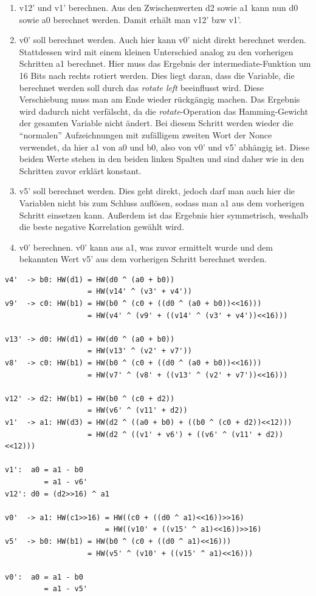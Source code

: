\documentclass[a4paper,ngerman]{scrreprt}
\begin{document}
\begin{enumerate}
    \item v12' und v1' berechnen. Aus den Zwischenwerten d2 sowie a1 kann nun d0
        sowie a0 berechnet werden. Damit erhält man v12' bzw v1'.

    \item v0' soll berechnet werden. Auch hier kann v0' nicht direkt berechnet
        werden. Stattdessen wird mit einem kleinen Unterschied analog zu den
        vorherigen Schritten a1 berechnet. Hier muss das Ergebnis der
        intermediate-Funktion um 16 Bits nach rechts rotiert werden. Dies liegt
        daran, dass die Variable, die berechnet werden soll durch das
        \emph{rotate left} beeinflusst wird. Diese Verschiebung muss man am Ende
        wieder rückgängig machen. Das Ergebnis wird dadurch nicht verfälscht, da
        die \emph{rotate}-Operation das Hamming-Gewicht der gesamten Variable
        nicht ändert. Bei diesem Schritt werden wieder die ``normalen''
        Aufzeichnungen mit zufälligem zweiten Wort der Nonce verwendet, da hier
        a1 von a0 und b0, also von v0' und v5' abhängig ist. Diese beiden Werte
        stehen in den beiden linken Spalten und sind daher wie in den Schritten
        zuvor erklärt konstant.

    \item v5' soll berechnet werden. Dies geht direkt, jedoch darf man auch hier
        die Variablen nicht bis zum Schluss auflösen, sodass man a1 aus dem
        vorherigen Schritt einsetzen kann. Außerdem ist das Ergebnis hier
        symmetrisch, weshalb die beste negative Korrelation gewählt wird.

    \item v0' berechnen. v0' kann aus a1, was zuvor ermittelt wurde und dem
        bekannten Wert v5' aus dem vorherigen Schritt berechnet werden.
\end{enumerate}


\begin{lstlisting}[caption={Modelle für Stromverbrauch}, label=lst:cpa-model-3]
v4'  -> b0: HW(d1) = HW(d0 ^ (a0 + b0))
                   = HW(v14' ^ (v3' + v4'))
v9'  -> c0: HW(b1) = HW(b0 ^ (c0 + ((d0 ^ (a0 + b0))<<16)))
                   = HW(v4' ^ (v9' + ((v14' ^ (v3' + v4'))<<16)))

v13' -> d0: HW(d1) = HW(d0 ^ (a0 + b0))
                   = HW(v13' ^ (v2' + v7'))
v8'  -> c0: HW(b1) = HW(b0 ^ (c0 + ((d0 ^ (a0 + b0))<<16)))
                   = HW(v7' ^ (v8' + ((v13' ^ (v2' + v7'))<<16)))

v12' -> d2: HW(b1) = HW(b0 ^ (c0 + d2))
                   = HW(v6' ^ (v11' + d2))
v1'  -> a1: HW(d3) = HW(d2 ^ ((a0 + b0) + ((b0 ^ (c0 + d2))<<12)))
                   = HW(d2 ^ ((v1' + v6') + ((v6' ^ (v11' + d2))<<12)))

v1':  a0 = a1 - b0
         = a1 - v6'
v12': d0 = (d2>>16) ^ a1

v0'  -> a1: HW(c1>>16) = HW((c0 + ((d0 ^ a1)<<16))>>16)
                       = HW((v10' + ((v15' ^ a1)<<16))>>16)
v5'  -> b0: HW(b1) = HW(b0 ^ (c0 + ((d0 ^ a1)<<16)))
                   = HW(v5' ^ (v10' + ((v15' ^ a1)<<16)))

v0':  a0 = a1 - b0
         = a1 - v5'
\end{lstlisting}
\end{document}
